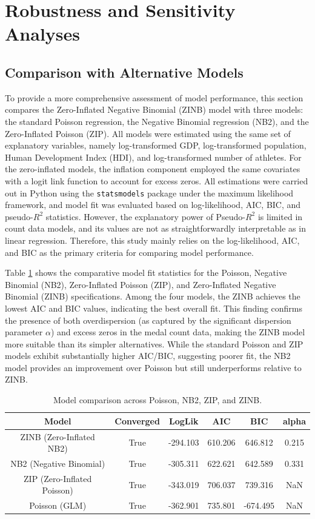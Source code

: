 \documentclass[11pt,twoside]{article}
\numberwithin{Theorem}{section}
\numberwithin{Definition}{section}
\numberwithin{Lemma}{section}
\numberwithin{Algorithm}{section}
\numberwithin{equation}{section}
\begin{document}
\section{Robustness and Sensitivity Analyses}
\subsection{Comparison with Alternative Models}

To provide a more comprehensive assessment of model performance, this section compares the Zero-Inflated Negative Binomial (ZINB) model with three models: the standard Poisson regression, the Negative Binomial regression (NB2), and the Zero-Inflated Poisson (ZIP). All models were estimated using the same set of explanatory variables, namely log-transformed GDP, log-transformed population, Human Development Index (HDI), and log-transformed number of athletes. For the zero-inflated models, the inflation component employed the same covariates with a logit link function to account for excess zeros. All estimations were carried out in Python using the \texttt{statsmodels} package under the maximum likelihood framework, and model fit was evaluated based on log-likelihood, AIC, BIC, and pseudo-$R^2$ statistics. However, the explanatory power of Pseudo-$R^2$ is limited in count data models, and its values are not as straightforwardly interpretable as in linear regression. Therefore, this study mainly relies on the log-likelihood, AIC, and BIC as the primary criteria for comparing model performance.



Table \ref{tab:model_comparison} shows the comparative model fit statistics for the Poisson, Negative Binomial (NB2), Zero-Inflated Poisson (ZIP), and Zero-Inflated Negative Binomial (ZINB) specifications. Among the four models, the ZINB achieves the lowest AIC and BIC values, indicating the best overall fit. This finding confirms the presence of both overdispersion (as captured by the significant dispersion parameter $\alpha$) and excess zeros in the medal count data, making the ZINB model more suitable than its simpler alternatives. While the standard Poisson and ZIP models exhibit substantially higher AIC/BIC, suggesting poorer fit, the NB2 model provides an improvement over Poisson but still underperforms relative to ZINB.

\begin{table}[H]
\centering
\caption{Model comparison across Poisson, NB2, ZIP, and ZINB.}
\label{tab:model_comparison}
\begin{tabular}{cccccc}
\toprule
Model & Converged & LogLik & AIC & BIC & alpha \\
\midrule
ZINB (Zero-Inflated NB2)   & True & -294.103 & 610.206 & 646.812 & 0.215 \\
NB2 (Negative Binomial)    & True & -305.311 & 622.621 & 642.589 & 0.331 \\
ZIP (Zero-Inflated Poisson)& True & -343.019 & 706.037 & 739.316 &      NaN\\
Poisson (GLM)              & True & -362.901 & 735.801 & -674.495 &      NaN\\
\bottomrule
\end{tabular}
\end{table}
\end{document}
